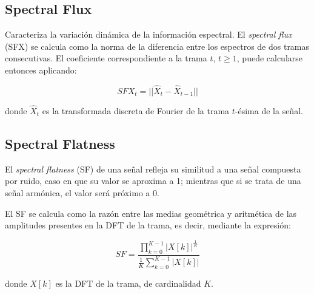 \subsection{Spectral Flux}\label{subsec:spectralFlux}

Caracteriza la variación dinámica de la información espectral.
El \textit{spectral flux} (SFX) se calcula como la norma de la diferencia entre los espectros de dos tramas consecutivas.
El coeficiente correspondiente a la trama $t$, $t\geq 1$, puede calcularse entonces aplicando:

\begin{equation}
    \label{eq:SFX}
    SFX_t = ||\hat{X}_t -\hat{X}_{t-1}||
\end{equation}

\noindent
donde $\hat{X}_t$ es la transformada discreta de Fourier de la trama $t$-ésima de la señal.

\subsection{Spectral Flatness}\label{subsec:spectralFlatness}

El \textit{spectral flatness} (SF) de una señal refleja su similitud a una señal compuesta por ruido, caso en que su valor se aproxima a 1;
mientras que si se trata de una señal armónica, el valor será próximo a 0.

El SF se calcula como la razón entre las medias geométrica y aritmética de las amplitudes presentes en la DFT de la trama, es decir, mediante la expresión:

\begin{equation}
    \label{eq:SF}
    SF = \frac{\prod_{k=0}^{K-1}{|X[k]|}^{\frac{1}{K}}}{\frac{1}{K}\sum_{k=0}^{K-1}{|X[k]|}}
\end{equation}

\noindent
donde $X[k]$ es la DFT de la trama, de cardinalidad $K$.
